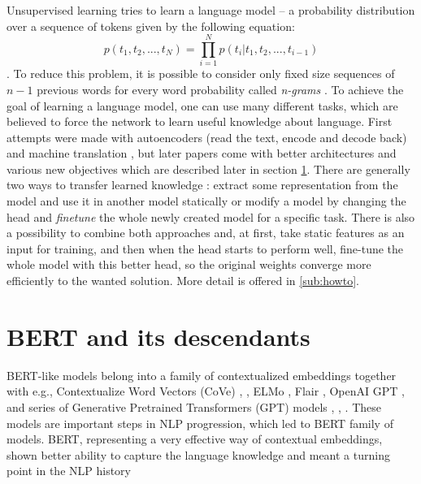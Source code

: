\par
Unsupervised learning tries to learn a language model -- a probability distribution over a sequence of tokens given by the following equation:
 \begin{equation*}
  p(t_1, t_2,...,t_N) =\prod_{i=1}^{N} p(t_i | t_1, t_2, ..., t_{i-1})
\end{equation*} \citep{Liu2020}. To reduce this problem, it is possible to consider only fixed size sequences of $n-1$ previous words for every word probability called \textit{n-grams} \citep{Bengio2003}. To achieve the goal of learning a language model, one can use many different tasks, which are believed to force the network to learn useful knowledge about language. First attempts were made with autoencoders (read the text, encode and decode back) \citep{Dai2015} and machine translation \citep{Ramachandran2017}, but later papers come with better architectures and various new objectives which are described later in section \ref{sec:bert}.  There are generally two ways to transfer learned knowledge \citep{Feijo2020}: extract some representation from the model and use it in another model statically or modify a model by changing the head and \textit{finetune} the whole newly created model for a specific task. There is also a possibility to combine both approaches and, at first, take static features as an input for training, and then when the head starts to perform well, fine-tune the whole model with this better head, so the original weights converge more efficiently to the wanted solution. More detail is offered in \ref{sub:howto}.
\section{BERT and its descendants}
\label{sec:bert}
BERT-like models belong into a family of contextualized embeddings together with e.g., Contextualize Word Vectors (CoVe) \citep{McCann2017}, \citep{Peters2017}, ELMo \citep{Peters2018}, Flair \citep{Akbik2018}, OpenAI GPT  , and series of Generative Pretrained Transformers (GPT) models \citep{Radfort2018}, \citep{RadfordAlec2019}, \citep{Brown2020}. These models are important steps in NLP progression, which led to BERT family of models. BERT, representing a very effective way of contextual embeddings, shown better ability to capture the language knowledge and meant a turning point in the NLP history %
